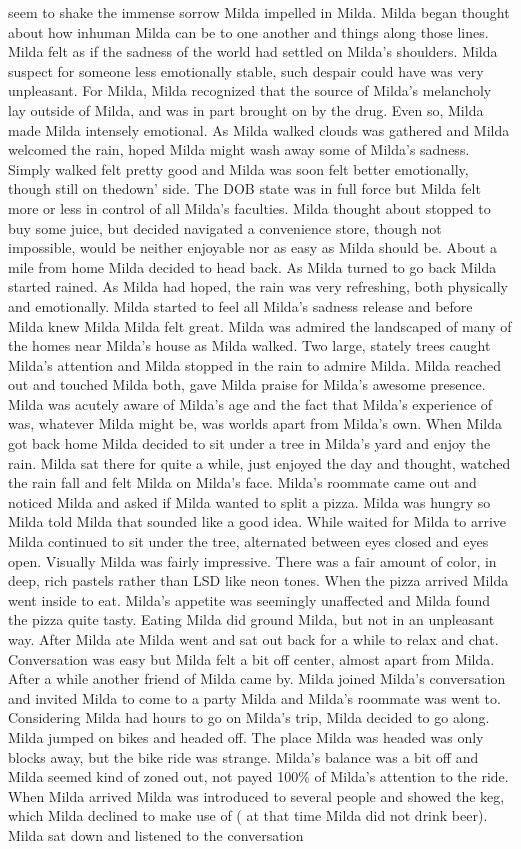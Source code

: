 \documentclass[12pt]{book}
\begin{document}
seem to shake the immense sorrow Milda impelled in Milda. Milda began thought about how inhuman Milda can be to one another and things along those lines. Milda felt as if the sadness of the world had settled on Milda's shoulders. Milda suspect for someone less emotionally stable, such despair could have was very unpleasant. For Milda, Milda recognized that the source of Milda's melancholy lay outside of Milda, and was in part brought on by the drug. Even so, Milda made Milda intensely emotional. As Milda walked clouds was gathered and Milda welcomed the rain, hoped Milda might wash away some of Milda's sadness. Simply walked felt pretty good and Milda was soon felt better emotionally, though still on thedown' side. The DOB state was in full force but Milda felt more or less in control of all Milda's faculties. Milda thought about stopped to buy some juice, but decided navigated a convenience store, though not impossible, would be neither enjoyable nor as easy as Milda should be. About a mile from home Milda decided to head back. As Milda turned to go back Milda started rained. As Milda had hoped, the rain was very refreshing, both physically and emotionally. Milda started to feel all Milda's sadness release and before Milda knew Milda Milda felt great. Milda was admired the landscaped of many of the homes near Milda's house as Milda walked. Two large, stately trees caught Milda's attention and Milda stopped in the rain to admire Milda. Milda reached out and touched Milda both, gave Milda praise for Milda's awesome presence. Milda was acutely aware of Milda's age and the fact that Milda's experience of was, whatever Milda might be, was worlds apart from Milda's own. When Milda got back home Milda decided to sit under a tree in Milda's yard and enjoy the rain. Milda sat there for quite a while, just enjoyed the day and thought, watched the rain fall and felt Milda on Milda's face. Milda's roommate came out and noticed Milda and asked if Milda wanted to split a pizza. Milda was hungry so Milda told Milda that sounded like a good idea. While waited for Milda to arrive Milda continued to sit under the tree, alternated between eyes closed and eyes open. Visually Milda was fairly impressive. There was a fair amount of color, in deep, rich pastels rather than LSD like neon tones. When the pizza arrived Milda went inside to eat. Milda's appetite was seemingly unaffected and Milda found the pizza quite tasty. Eating Milda did ground Milda, but not in an unpleasant way. After Milda ate Milda went and sat out back for a while to relax and chat. Conversation was easy but Milda felt a bit off center, almost apart from Milda. After a while another friend of Milda came by. Milda joined Milda's conversation and invited Milda to come to a party Milda and Milda's roommate was went to. Considering Milda had hours to go on Milda's trip, Milda decided to go along. Milda jumped on bikes and headed off. The place Milda was headed was only blocks away, but the bike ride was strange. Milda's balance was a bit off and Milda seemed kind of zoned out, not payed 100\% of Milda's attention to the ride. When Milda arrived Milda was introduced to several people and showed the keg, which Milda declined to make use of ( at that time Milda did not drink beer). Milda sat down and listened to the conversation 
\end{document}
